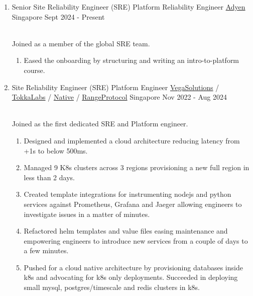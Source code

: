 \documentclass{CVSoftwareEngineer}
\begin{document}
	\begin{enumerate}[labelwidth=!, labelindent=0pt, leftmargin=*, rightmargin=15pt]

		\item[] \cvExperience
			{Senior Site Reliability Engineer (SRE) \textbar\space Platform Reliability Engineer}
			{\href{https://adyen.com}{Adyen}}
			{Singapore}
			{Sept 2024 - Present}
			{
				\\ Joined as a member of the global SRE team.
				\begin{enumerate}[labelwidth=!, labelindent=0pt, nosep, leftmargin=*]
					\item[\textasteriskcentered] Eased the onboarding by structuring and writing an intro-to-platform course.
				\end{enumerate}
			}

		\item[] \cvExperience
			{Site Reliability Engineer (SRE) \textbar\space Platform Engineer}
			{\href{https://vegasolutions.co}{VegaSolutions} / \href{https://tokkalabs.com}{TokkaLabs} / \href{https://native.org/}{Native} / \href{https://www.rangeprotocol.com/}{RangeProtocol}}
			{Singapore}
			{Nov 2022 - Aug 2024}
			{
				\\ Joined as the first dedicated SRE and Platform engineer.
				\begin{enumerate}[labelwidth=!, labelindent=0pt, nosep, leftmargin=*]
					\item[\textasteriskcentered] Designed and implemented a cloud architecture reducing
						latency from +1s to below 500ms.
					\item[\textasteriskcentered] Managed 9 K8s clusters across 3 regions provisioning a new full region in less than 2 days.
					\item[\textasteriskcentered] Created template integrations for instrumenting nodejs and python services
						against Prometheus, Grafana and Jaeger allowing engineers to investigate issues in a matter of minutes.
					\item[\textasteriskcentered] Refactored helm templates and value files easing maintenance and empowering
						engineers to introduce new services from a couple of days to a few minutes.
						\item[\textasteriskcentered] Pushed for a cloud native architecture by provisioning databases inside k8s
						and advocating for k8s only deployments. Succeeded in deploying small mysql, postgres/timescale and redis
						clusters in k8s.
				\end{enumerate}
			}


\end{enumerate}
\end{document}
